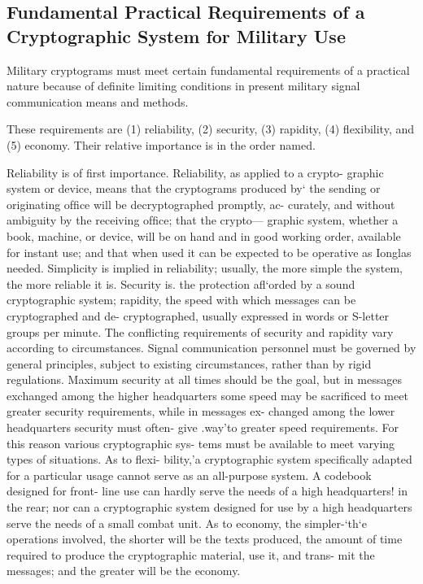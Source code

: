 \subsection{Fundamental Practical Requirements of a Cryptographic System for Military Use}

\mypara Military cryptograms must meet certain fundamental requirements
of a practical nature because of deﬁnite limiting conditions in present
military signal communication means and methods.

\mypara These requirements are (1) reliability, (2) security, (3) rapidity,
(4) ﬂexibility, and (5) economy. Their relative importance is in the
order named.

\mypara Reliability is of ﬁrst importance. Reliability, as applied to a crypto-
graphic system or device, means that the cryptograms produced by‘ the
sending or originating ofﬁce will be decryptographed promptly, ac-
curately, and without ambiguity by the receiving ofﬁce; that the crypto—
graphic system, whether a book, machine, or device, will be on hand and
in good working order, available for instant use; and that when used it
can be expected to be operative as Ionglas needed. Simplicity is implied
in reliability; usually, the more simple the system, the more reliable it is.
Security is. the protection aﬂ‘orded by a sound cryptographic system;
rapidity, the speed with which messages can be cryptographed and de-
cryptographed, usually expressed in words or S-letter groups per minute.
The conﬂicting requirements of security and rapidity vary according to
circumstances. Signal communication personnel must be governed by
general principles, subject to existing circumstances, rather than by rigid
regulations. Maximum security at all times should be the goal, but in
messages exchanged among the higher headquarters some speed may be
sacriﬁced to meet greater security requirements, while in messages ex-
changed among the lower headquarters security must often- give .way'to
greater speed requirements. For this reason various cryptographic sys-
tems must be available to meet varying types of situations. As to ﬂexi-
bility,'a cryptographic system speciﬁcally adapted for a particular usage
cannot serve as an all-purpose system. A codebook designed for front-
line use can hardly serve the needs of a high headquarters! in the rear;
nor can a cryptographic system designed for use by a high headquarters
serve the needs of a small combat unit. As to economy, the simpler-‘th‘e
operations involved, the shorter will be the texts produced, the amount
of time required to produce the cryptographic material, use it, and trans-
mit the messages; and the greater will be the economy.

